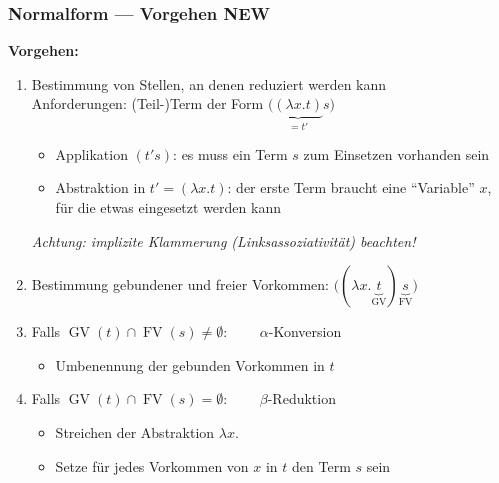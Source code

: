 \documentclass{beamer}
\DeclareMathOperator{\GV}{GV}
\DeclareMathOperator{\FV}{FV}
\begin{document}
\begin{frame} \frametitle{Normalform --- Vorgehen \hfill \alert{\small NEW}}
	\footnotesize
	\textbf{Vorgehen:}
	\begin{enumerate}
		\item Bestimmung von Stellen, an denen reduziert werden kann \\
		Anforderungen: (Teil-)Term der Form $\big( \underbrace{(\lambda x . t)}_{= t'} s \big)$
		\begin{itemize} \footnotesize
			\item Applikation $(t' s)$: es muss ein Term $s$ zum Einsetzen vorhanden sein
			\item Abstraktion in $t' = (\lambda x . t)$: der erste Term braucht eine \enquote{Variable} $x$, für die etwas eingesetzt werden kann
		\end{itemize} 
		\textit{Achtung: implizite Klammerung (Linksassoziativität) beachten!}
		\pause
		\item Bestimmung gebundener und freier Vorkommen: $\big( (\lambda x . \underbrace{t}_{\GV}) \underbrace{s}_{\FV} \big)$
		\pause
		\item Falls $\GV(t) \cap \FV(s) \neq \emptyset$: $\qquad \alpha$-Konversion
		\begin{itemize} \footnotesize
			\item Umbenennung der gebunden Vorkommen in $t$
		\end{itemize}
		\item Falls $\GV(t) \cap \FV(s) = \emptyset$: $\qquad \beta$-Reduktion
		\begin{itemize} \footnotesize
			\item Streichen der Abstraktion $\lambda x.$
			\item Setze für jedes Vorkommen von $x$ in $t$ den Term $s$ sein
		\end{itemize}
	\end{enumerate}
\end{frame}
\end{document}
